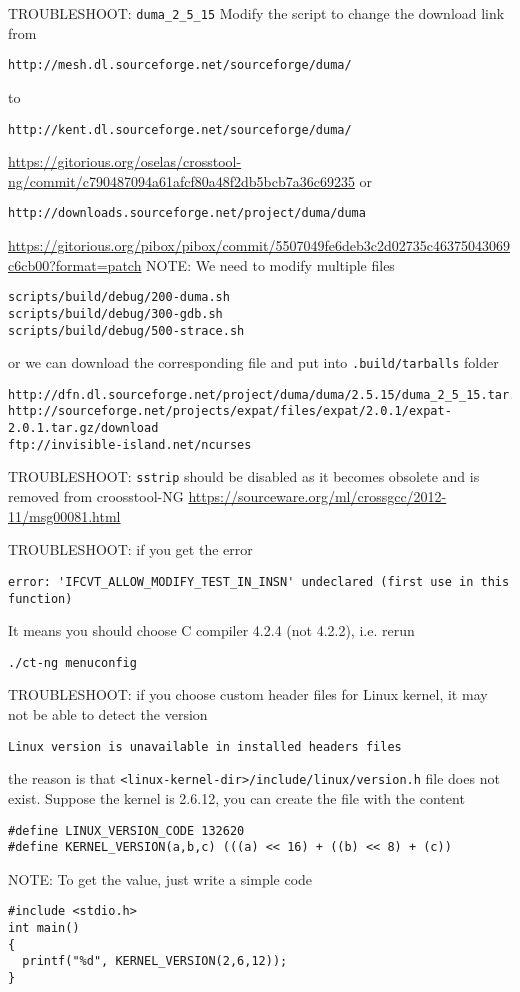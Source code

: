 TROUBLESHOOT: \verb!duma_2_5_15!
Modify the script to change the download link from
\begin{verbatim}
http://mesh.dl.sourceforge.net/sourceforge/duma/
\end{verbatim}
to
\begin{verbatim}
http://kent.dl.sourceforge.net/sourceforge/duma/
\end{verbatim}
\url{https://gitorious.org/oselas/crosstool-ng/commit/c790487094a61afcf80a48f2db5bcb7a36c69235}
or
\begin{verbatim}
http://downloads.sourceforge.net/project/duma/duma
\end{verbatim}
\url{https://gitorious.org/pibox/pibox/commit/5507049fe6deb3c2d02735c46375043069c6cb00?format=patch}
NOTE: We need to modify multiple files 
\begin{verbatim}
scripts/build/debug/200-duma.sh
scripts/build/debug/300-gdb.sh
scripts/build/debug/500-strace.sh
\end{verbatim} 
or we can download the corresponding file and put into \verb!.build/tarballs! folder
\begin{verbatim}
http://dfn.dl.sourceforge.net/project/duma/duma/2.5.15/duma_2_5_15.tar.gz
http://sourceforge.net/projects/expat/files/expat/2.0.1/expat-2.0.1.tar.gz/download
ftp://invisible-island.net/ncurses
\end{verbatim}

TROUBLESHOOT: \verb!sstrip! should be disabled as it becomes
obsolete and is removed from croosstool-NG
\url{https://sourceware.org/ml/crossgcc/2012-11/msg00081.html}

TROUBLESHOOT: if you get the error
\begin{verbatim}
error: 'IFCVT_ALLOW_MODIFY_TEST_IN_INSN' undeclared (first use in this
function)
\end{verbatim}
It means you should choose C compiler 4.2.4 (not 4.2.2), i.e. rerun
\begin{verbatim}
./ct-ng menuconfig
\end{verbatim}


TROUBLESHOOT: if you choose custom header files for Linux kernel, it
may not be able to detect the version
\begin{verbatim}
Linux version is unavailable in installed headers files
\end{verbatim}
the reason is that \verb!<linux-kernel-dir>/include/linux/version.h!
file does not exist. Suppose the kernel is 2.6.12, you can create the file with the content
\begin{verbatim}
#define LINUX_VERSION_CODE 132620
#define KERNEL_VERSION(a,b,c) (((a) << 16) + ((b) << 8) + (c))
\end{verbatim}
NOTE: To get the value, just write a simple code
\begin{verbatim}
#include <stdio.h>
int main()
{
  printf("%d", KERNEL_VERSION(2,6,12));
}
\end{verbatim}

